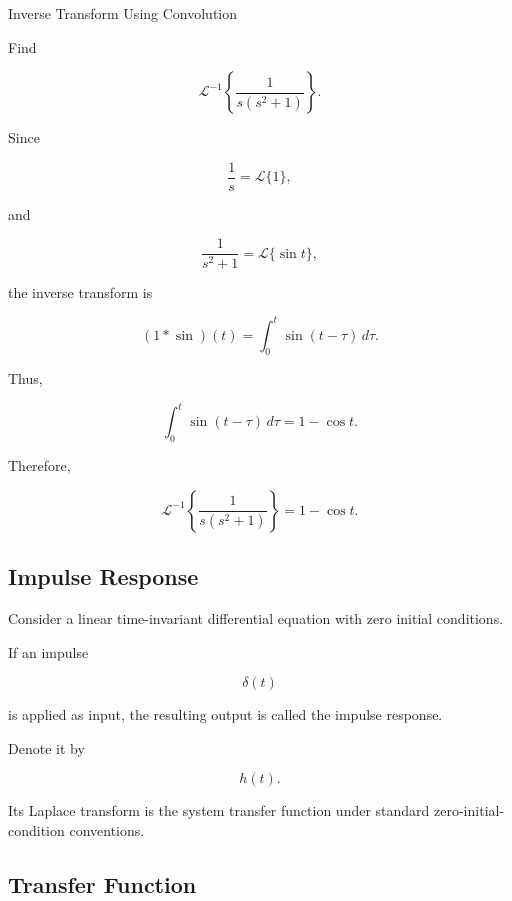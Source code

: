 \begin{workedexamplebox}{Inverse Transform Using Convolution}

Find

\[
\mathcal{L}^{-1}
\left\{
\frac1{
s(s^2+1)
}
\right\}.
\]

Since

\[
\frac1s
=
\mathcal{L}\{1\},
\]

and

\[
\frac1{s^2+1}
=
\mathcal{L}\{\sin t\},
\]

the inverse transform is

\[
(1*\sin)(t)
=
\int_0^t
\sin(t-\tau)\,d\tau.
\]

Thus,

\[
\int_0^t
\sin(t-\tau)\,d\tau
=
1-\cos t.
\]

Therefore,

\begin{answerbox}
\[
\boxed{
\mathcal{L}^{-1}
\left\{
\frac1{s(s^2+1)}
\right\}
=
1-\cos t.
}
\]
\end{answerbox}

\end{workedexamplebox}

\subsection{Impulse Response}
\label{subsec:impulse-response}

Consider a linear time-invariant differential equation with zero initial
conditions.

If an impulse

\[
\delta(t)
\]

is applied as input, the resulting output is called the impulse response.

Denote it by

\[
\boxed{
h(t).
}
\]

Its Laplace transform is the system transfer function under standard
zero-initial-condition conventions.

\subsection{Transfer Function}
\label{subsec:transfer-function}

